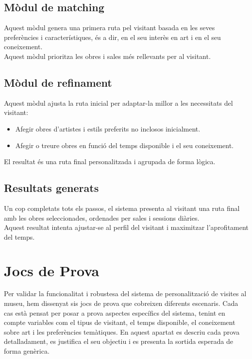 \documentclass[a4paper]{article}
\begin{document}
	\subsection{Mòdul de matching}
	
	Aquest mòdul genera una primera ruta pel visitant basada en les seves preferències i característiques, és a dir, en el seu interès en art i en el seu coneixement. \\
	
	Aquest mòdul prioritza les obres i sales més rellevants per al visitant.
	
	\subsection{Mòdul de refinament}
	
	Aquest mòdul ajusta la ruta inicial per adaptar-la millor a les necessitats del visitant:
	\begin{itemize}
		\item Afegir obres d'artistes i estils preferits no inclosos inicialment.
		\item Afegir o treure obres en funció del temps disponible i el seu coneixement.
	\end{itemize}
	El resultat és una ruta final personalitzada i agrupada de forma lògica.
	
	\subsection{Resultats generats}
	
	Un cop completats tots els passos, el sistema presenta al visitant una ruta final amb les obres seleccionades, ordenades per sales i sessions diàries. \\
	
	Aquest resultat intenta ajustar-se al perfil del visitant i maximitzar l’aprofitament del temps.
	
	
	\newpage
	\section{Jocs de Prova}
	
	Per validar la funcionalitat i robustesa del sistema de personalització de visites al museu, hem dissenyat sis jocs de prova que cobreixen diferents escenaris. Cada cas està pensat per posar a prova aspectes específics del sistema, tenint en compte variables com el tipus de visitant, el temps disponible, el coneixement sobre art i les preferències temàtiques. En aquest apartat es descriu cada prova detalladament, es justifica el seu objectiu i es presenta la sortida esperada de forma genèrica.
	
\end{document}
